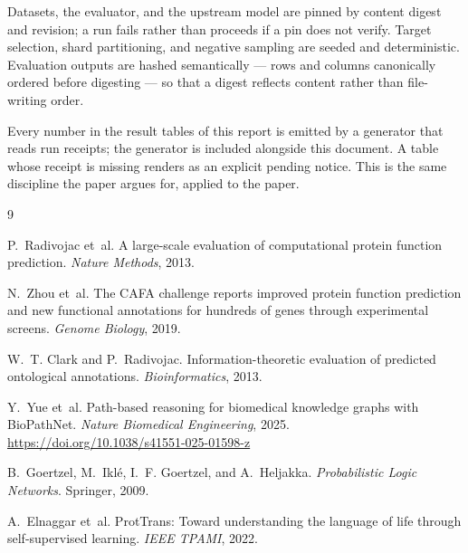 \documentclass[11pt]{article}
\begin{document}
Datasets, the evaluator, and the upstream model are pinned by content digest and
revision; a run fails rather than proceeds if a pin does not verify. Target
selection, shard partitioning, and negative sampling are seeded and
deterministic. Evaluation outputs are hashed semantically --- rows and columns
canonically ordered before digesting --- so that a digest reflects content
rather than file-writing order.

Every number in the result tables of this report is emitted by a generator that
reads run receipts; the generator is included alongside this document. A table
whose receipt is missing renders as an explicit pending notice. This is the same
discipline the paper argues for, applied to the paper.

\begin{thebibliography}{9}

 P.~Radivojac et~al.
  \newblock A large-scale evaluation of computational protein function prediction.
  \newblock \emph{Nature Methods}, 2013.

 N.~Zhou et~al.
  \newblock The CAFA challenge reports improved protein function prediction and
  new functional annotations for hundreds of genes through experimental
  screens.
  \newblock \emph{Genome Biology}, 2019.

 W.~T. Clark and P.~Radivojac.
  \newblock Information-theoretic evaluation of predicted ontological
  annotations.
  \newblock \emph{Bioinformatics}, 2013.

 Y.~Yue et~al.
  \newblock Path-based reasoning for biomedical knowledge graphs with
  BioPathNet.
  \newblock \emph{Nature Biomedical Engineering}, 2025.
  \newblock \url{https://doi.org/10.1038/s41551-025-01598-z}

 B.~Goertzel, M.~Ikl\'{e}, I.~F. Goertzel, and A.~Heljakka.
  \newblock \emph{Probabilistic Logic Networks}.
  \newblock Springer, 2009.

 A.~Elnaggar et~al.
  \newblock ProtTrans: Toward understanding the language of life through
  self-supervised learning.
  \newblock \emph{IEEE TPAMI}, 2022.

\end{thebibliography}
\end{document}
